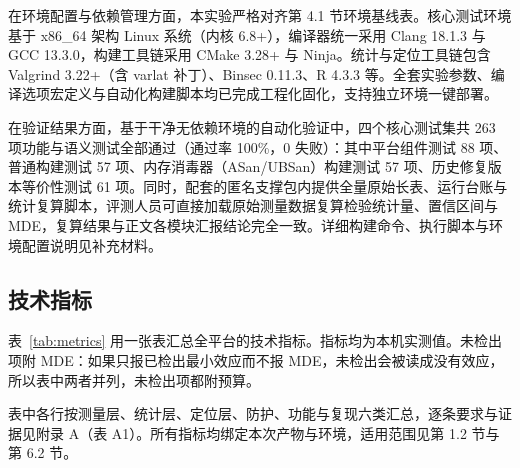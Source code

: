 在环境配置与依赖管理方面，本实验严格对齐第 4.1 节环境基线表。核心测试环境基于 x86\_64 架构 Linux 系统（内核 6.8+），编译器统一采用 Clang 18.1.3 与 GCC 13.3.0，构建工具链采用 CMake 3.28+ 与 Ninja。统计与定位工具链包含 Valgrind 3.22+（含 varlat 补丁）、Binsec 0.11.3、R 4.3.3 等。全套实验参数、编译选项宏定义与自动化构建脚本均已完成工程化固化，支持独立环境一键部署。

在验证结果方面，基于干净无依赖环境的自动化验证中，四个核心测试集共 263 项功能与语义测试全部通过（通过率 100\%，0 失败）：其中平台组件测试 88 项、普通构建测试 57 项、内存消毒器（ASan/UBSan）构建测试 57 项、历史修复版本等价性测试 61 项。同时，配套的匿名支撑包内提供全量原始长表、运行台账与统计复算脚本，评测人员可直接加载原始测量数据复算检验统计量、置信区间与 MDE，复算结果与正文各模块汇报结论完全一致。详细构建命令、执行脚本与环境配置说明见补充材料。

\subsection{技术指标}

表~\ref{tab:metrics} 用一张表汇总全平台的技术指标。指标均为本机实测值。未检出项附 MDE：如果只报已检出最小效应而不报 MDE，未检出会被读成没有效应，所以表中两者并列，未检出项都附预算。

表中各行按测量层、统计层、定位层、防护、功能与复现六类汇总，逐条要求与证据见附录 A（表 A1）。所有指标均绑定本次产物与环境，适用范围见第 1.2 节与第 6.2 节。

